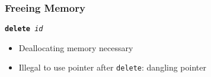 \documentclass{../ucll-slides}
\begin{document}
\begin{frame}
  \frametitle{Freeing Memory}
  \begin{center}
    \tt {\bfseries delete} {\it id}
  \end{center}
  \begin{itemize}
    \item Deallocating memory necessary
    \item Illegal to use pointer after {\tt delete}: dangling pointer
  \end{itemize}
  \vskip5mm
\end{frame}
\end{document}
